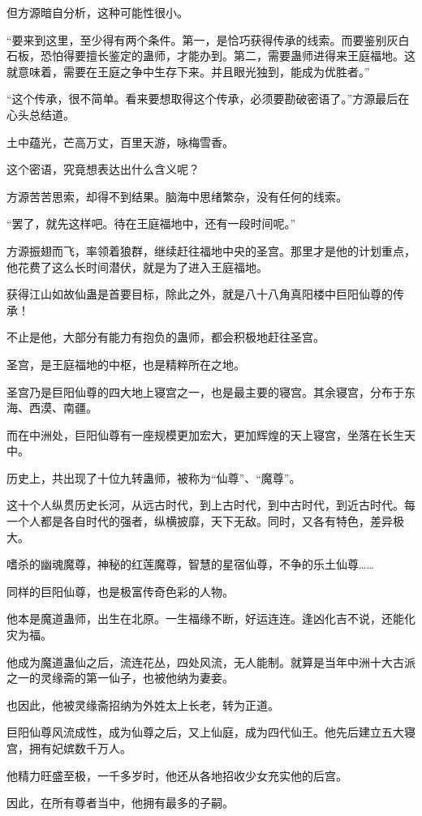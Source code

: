 \begin{this_body}
但方源暗自分析，这种可能性很小。

“要来到这里，至少得有两个条件。第一，是恰巧获得传承的线索。而要鉴别灰白石板，恐怕得要擅长鉴定的蛊师，才能办到。第二，需要蛊师进得来王庭福地。这就意味着，需要在王庭之争中生存下来。并且眼光独到，能成为优胜者。”

“这个传承，很不简单。看来要想取得这个传承，必须要勘破密语了。”方源最后在心头总结道。

土中蕴光，芒高万丈，百里天游，咏梅雪香。

这个密语，究竟想表达出什么含义呢？

方源苦苦思索，却得不到结果。脑海中思绪繁杂，没有任何的线索。

“罢了，就先这样吧。待在王庭福地中，还有一段时间呢。”

方源振翅而飞，率领着狼群，继续赶往福地中央的圣宫。那里才是他的计划重点，他花费了这么长时间潜伏，就是为了进入王庭福地。

获得江山如故仙蛊是首要目标，除此之外，就是八十八角真阳楼中巨阳仙尊的传承！

不止是他，大部分有能力有抱负的蛊师，都会积极地赶往圣宫。

圣宫，是王庭福地的中枢，也是精粹所在之地。

圣宫乃是巨阳仙尊的四大地上寝宫之一，也是最主要的寝宫。其余寝宫，分布于东海、西漠、南疆。

而在中洲处，巨阳仙尊有一座规模更加宏大，更加辉煌的天上寝宫，坐落在长生天中。

历史上，共出现了十位九转蛊师，被称为“仙尊”、“魔尊”。

这十个人纵贯历史长河，从远古时代，到上古时代，到中古时代，到近古时代。每一个人都是各自时代的强者，纵横披靡，天下无敌。同时，又各有特色，差异极大。

嗜杀的幽魂魔尊，神秘的红莲魔尊，智慧的星宿仙尊，不争的乐土仙尊……

同样的巨阳仙尊，也是极富传奇色彩的人物。

他本是魔道蛊师，出生在北原。一生福缘不断，好运连连。逢凶化吉不说，还能化灾为福。

他成为魔道蛊仙之后，流连花丛，四处风流，无人能制。就算是当年中洲十大古派之一的灵缘斋的第一仙子，也被他纳为妻妾。

也因此，他被灵缘斋招纳为外姓太上长老，转为正道。

巨阳仙尊风流成性，成为仙尊之后，又上仙庭，成为四代仙王。他先后建立五大寝宫，拥有妃嫔数千万人。

他精力旺盛至极，一千多岁时，他还从各地招收少女充实他的后宫。

因此，在所有尊者当中，他拥有最多的子嗣。


\end{this_body}
